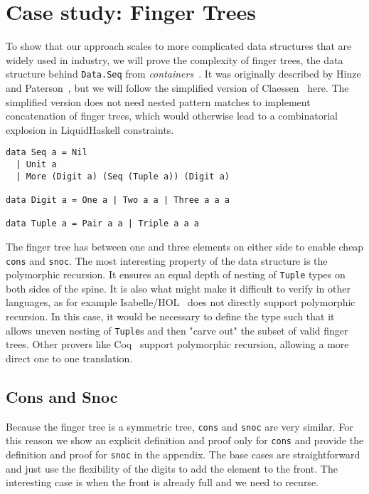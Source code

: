 \documentclass[sigplan,screen]{acmart}
\begin{document}
\section{Case study: Finger Trees}\label{sec:fingertree}

To show that our approach scales to more complicated data structures that are widely used in industry, we will prove the complexity of finger trees, the data structure behind \texttt{Data.Seq} from \textit{containers}~\cite{containers}. It was originally described by Hinze and Paterson~\cite{fingertrees}, but we will follow the simplified version of Claessen~\cite{fingertrees_new} here. The simplified version does not need nested pattern matches to implement concatenation of finger trees, which would otherwise lead to a combinatorial explosion in LiquidHaskell constraints.

\begin{lstlisting}
data Seq a = Nil
  | Unit a
  | More (Digit a) (Seq (Tuple a)) (Digit a)

data Digit a = One a | Two a a | Three a a a

data Tuple a = Pair a a | Triple a a a
\end{lstlisting}

The finger tree has between one and three elements on either side to enable cheap \texttt{cons} and \texttt{snoc}. The most interesting property of the data structure is the polymorphic recursion. It ensures an equal depth of nesting of \texttt{Tuple} types on both sides of the spine. It is also what might make it difficult to verify in other languages, as for example Isabelle/HOL~\cite{isabelle} does not directly support polymorphic recursion. In this case, it would be necessary to define the type such that it allows uneven nesting of \texttt{Tuple}s and then "carve out" the subset of valid finger trees. Other provers like Coq~\cite{coq} support polymorphic recursion, allowing a more direct one to one translation.

\subsection{Cons and Snoc}

Because the finger tree is a symmetric tree, \texttt{cons} and \texttt{snoc} are very similar. For this reason we show an explicit definition and proof only for \texttt{cons} and provide the definition and proof for \texttt{snoc} in the appendix. The base cases are straightforward and just use the flexibility of the digits to add the element to the front. The interesting case is when the front is already full and we need to recurse.
\end{document}
